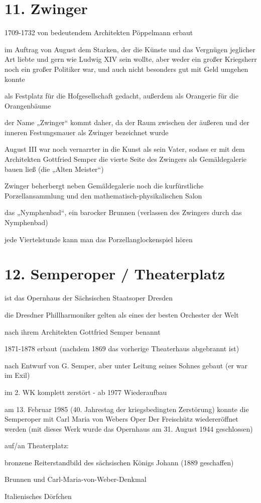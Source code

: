 \documentclass[a4paper,12pt]{report}
\begin{document}
\section{11. Zwinger}
\begin{itemize*}
\item 1709-1732 von bedeutendem Architekten Pöppelmann erbaut
\item im Auftrag von August dem Starken, der die Künste und das Vergnügen jeglicher Art liebte und gern wie Ludwig XIV sein wollte, aber weder ein großer Kriegsherr noch ein großer Politiker war, und auch nicht besonders gut mit Geld umgehen konnte
\item als Festplatz für die Hofgesellschaft gedacht, außerdem als Orangerie für die Orangenbäume
\item der Name „Zwinger“ kommt daher, da der Raum zwischen der äußeren und der inneren Festungsmauer als Zwinger bezeichnet wurde
\item August III war noch vernarrter in die Kunst als sein Vater, sodass er mit dem Architekten Gottfried Semper die vierte Seite des Zwingers als Gemäldegalerie bauen ließ (die „Alten Meister“)
\item Zwinger beherbergt neben Gemäldegalerie noch die kurfürstliche Porzellansammlung und den mathematisch-physikalischen Salon
\item das „Nymphenbad“, ein barocker Brunnen (verlassen des Zwingers durch das Nymphenbad)
\item jede Viertelstunde kann man das Porzellanglockenspiel hören
\end{itemize*}

\section{12. Semperoper / Theaterplatz}
\begin{itemize*}
\item ist das Opernhaus der Sächsischen Staatsoper Dresden
\item die Dresdner Phillharmoniker gelten als eines der besten Orchester der Welt
\item nach ihrem Architekten Gottfried Semper benannt
\item 1871-1878 erbaut (nachdem 1869 das vorherige Theaterhaus abgebrannt ist)
\item nach Entwurf von G. Semper, aber unter Leitung seines Sohnes gebaut (er war im Exil)
\item im 2. WK komplett zerstört - ab 1977 Wiederaufbau
\item am 13. Februar 1985 (40. Jahrestag der kriegsbedingten Zerstörung) konnte die Semperoper mit Carl Maria von Webers Oper Der Freischütz wiedereröffnet werden (mit dieses Werk wurde das Opernhaus am 31. August 1944 geschlossen)
\item auf/an Theaterplatz:
    \begin{itemize*}
    \item bronzene Reiterstandbild des sächsischen Königs Johann (1889 geschaffen)
    \item Brunnen und Carl-Maria-von-Weber-Denkmal
    \item Italienisches Dörfchen
    \end{itemize*}
\end{itemize*}
\end{document}
